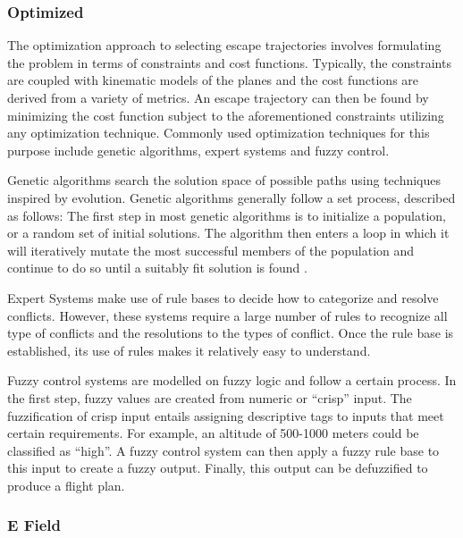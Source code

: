 \documentclass[conference]{IEEEtran}
\begin{document}
\subsubsection{Optimized}


The optimization approach to selecting escape trajectories involves formulating the problem in terms of constraints and cost functions.  Typically, the constraints are coupled with kinematic models of the planes and the cost functions are derived from a variety of metrics.  An escape trajectory can then be found by minimizing the cost function subject to the aforementioned constraints utilizing any optimization technique. Commonly used optimization techniques for this purpose include genetic algorithms, expert systems and fuzzy control.

Genetic algorithms search the solution space of possible paths using techniques inspired by evolution.  Genetic algorithms generally follow a set process, described as follows:  The first step in most genetic algorithms is to initialize a population, or a random set of initial solutions.  The algorithm then enters a loop in which it will iteratively mutate the most successful members of the population and continue to do so until a suitably fit solution is found \cite{siudynamic}.

Expert Systems make use of rule bases to decide how to categorize and resolve conflicts.  However, these systems require a large number of rules to recognize all type of conflicts and the resolutions to the types of conflict.  Once the rule base is established, its use of rules makes it relatively easy to understand. \cite{kuchar2000review}

Fuzzy control systems are modelled on fuzzy logic and follow a certain process.  In the first step, fuzzy values are created from numeric or “crisp” input.  The fuzzification of crisp input entails assigning descriptive tags to inputs that meet certain requirements.  For example, an altitude of 500-1000 meters could be classified as “high”.  A fuzzy control system can then apply a fuzzy rule base to this input to create a fuzzy output.  Finally, this output can be defuzzified to produce a flight plan. \cite{2012Fuzzy}

\subsubsection{E Field}
\end{document}
